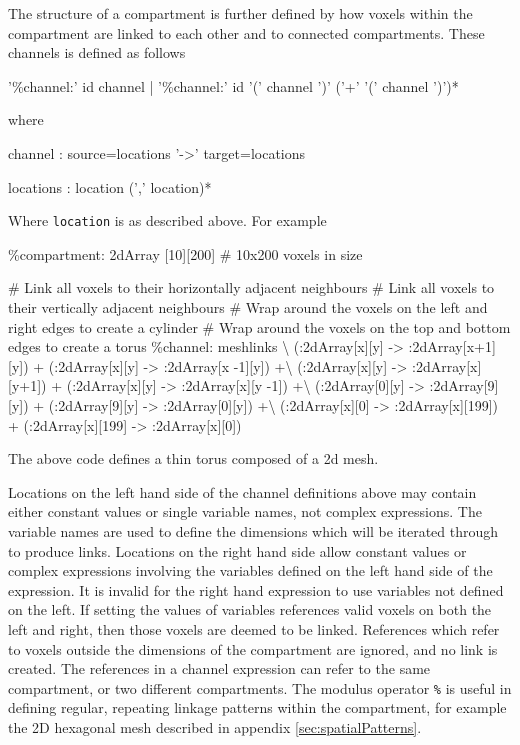 The structure of a compartment is further defined by how voxels within the compartment are linked to each other and to connected compartments. These channels is defined as follows
\begin{bnfsource}
'\%channel:' id channel
| '\%channel:' id '(' channel ')' ('+' '(' channel ')')*
\end{bnfsource}
where
\begin{bnfsource}
channel :
  source=locations '->' target=locations

locations :
  location (',' location)*
\end{bnfsource}
Where \verb|location| is as described above. For example
\begin{kappasource}
\%compartment: 2dArray [10][200]    # 10x200 voxels in size 

# Link all voxels to their horizontally adjacent neighbours
# Link all voxels to their vertically adjacent neighbours
# Wrap around the voxels on the left and right edges to create a cylinder
# Wrap around the voxels on the top and bottom edges to create a torus
\%channel: meshlinks {\textbackslash}
    (:2dArray[x][y] -> :2dArray[x+1][y]) + (:2dArray[x][y] -> :2dArray[x -1][y]) +{\textbackslash}
    (:2dArray[x][y] -> :2dArray[x][y+1]) + (:2dArray[x][y] -> :2dArray[x][y -1]) +{\textbackslash}
    (:2dArray[0][y] -> :2dArray[9][y])   + (:2dArray[9][y] -> :2dArray[0][y]) +{\textbackslash}
    (:2dArray[x][0] -> :2dArray[x][199]) + (:2dArray[x][199] -> :2dArray[x][0])
\end{kappasource}

The above code defines a thin torus composed of a 2d mesh.

Locations on the left hand side of the channel definitions above may contain either constant values or single variable names, not complex expressions. The variable names are used to define the dimensions which will be iterated through to produce links. Locations on the right hand side allow constant values or complex expressions involving the variables defined on the left hand side of the expression. It is invalid for the right hand expression to use variables not defined on the left. If setting the values of variables references valid voxels on both the left and right, then those voxels are deemed to be linked. References which refer to voxels outside the dimensions of the compartment are ignored, and no link is created. The references in a channel expression can refer to the same compartment, or two different compartments. The modulus operator \verb|%| is useful in defining regular, repeating linkage patterns within the compartment, for example the 2D hexagonal mesh described in appendix \ref{sec:spatialPatterns}.


